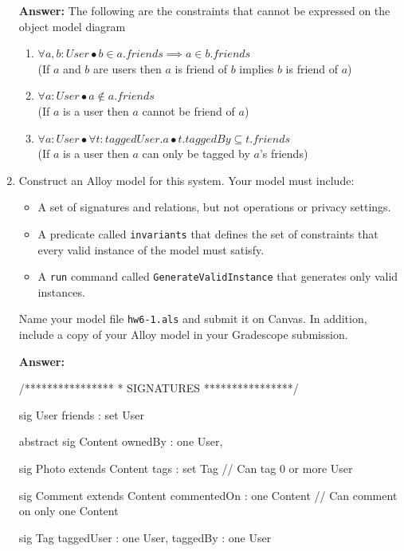 \begin{enumerate}
        \textbf {Answer:} The following are the constraints that cannot be expressed on the object model diagram
            \begin {enumerate}
                \item $ \forall a, b: User \bullet b \in a.friends \implies a \in b.friends $\\
(If $a$ and $b$ are users then $a$ is friend of $b$ implies $b$ is friend of $a$)
                \item $ \forall a : User \bullet a \notin a.friends $\\
                    (If $a$ is a user then $a$ cannot be friend of $a$)
                \item $ \forall a : User \bullet \forall t : taggedUser.a \bullet t.taggedBy \subseteq t.friends $ \\
                    (If $a$ is a user then $a$ can only be tagged by $a$’s friends)
            \end {enumerate}
	\item Construct an Alloy model for this system. Your model must
	      include:
	      \begin{itemize}
		      \item A set of signatures and relations, but not operations or
		            privacy settings.
		      \item A predicate called \texttt{invariants} that defines the
		            set of constraints that every valid instance of the model must satisfy.
		      \item A \texttt{run} command called \texttt{GenerateValidInstance} that generates only valid instances.
	      \end{itemize}
	      Name your model file \texttt{hw6-1.als}  and submit it on
	      Canvas. In addition, include a copy of your Alloy model in your
	      Gradescope submission. 

          \smallskip \textbf{Answer:} 
          \begin{alloy}
/****************
 * SIGNATURES
 ****************/

sig User {
	friends : set User
}

abstract sig Content {
	ownedBy : one User,
}

sig Photo extends Content {
    tags : set Tag  // Can tag 0 or more User
}

sig Comment extends Content {
	commentedOn : one Content // Can comment on only one Content
}

sig Tag {
    taggedUser : one User,
    taggedBy : one User
}


\end{alloy}
\end{enumerate}
